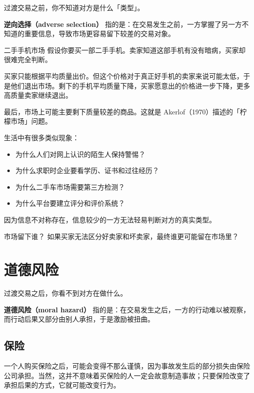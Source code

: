 \documentclass[10pt,a4paper]{ctexart}
\newcommand{\transitionnote}[1]{\begin{conceptbox}{过渡}#1\end{conceptbox}}
\begin{document}
\transitionnote{交易之前，你不知道对方是什么「类型」。}

\textbf{逆向选择（adverse selection）} 指的是：在交易发生之前，一方掌握了另一方不知道的重要信息，导致市场更容易留下较差的交易对象。

\begin{examplebox}{二手手机市场}
假设你要买一部二手手机。卖家知道这部手机有没有暗病，买家却很难完全判断。

买家只能根据平均质量出价。但这个价格对于真正好手机的卖家来说可能太低，于是他们退出市场。剩下的手机平均质量下降，买家愿意出的价格进一步下降，更多高质量卖家继续退出。

最后，市场上可能主要剩下质量较差的商品。这就是 Akerlof（1970）描述的「柠檬市场」问题。
\end{examplebox}

生活中有很多类似现象：
\begin{itemize}
  \item 为什么人们对网上认识的陌生人保持警惕？
  \item 为什么求职时企业要看学历、证书和过往经历？
  \item 为什么二手车市场需要第三方检测？
  \item 为什么平台要建立评分和评价系统？
\end{itemize}

因为信息不对称存在，信息较少的一方无法轻易判断对方的真实类型。

\begin{discussionbox}{市场留下谁？}
如果买家无法区分好卖家和坏卖家，最终谁更可能留在市场里？
\end{discussionbox}

\section{道德风险}

\transitionnote{交易之后，你看不到对方在做什么。}

\textbf{道德风险（moral hazard）} 指的是：在交易发生之后，一方的行动难以被观察，而行动后果又部分由别人承担，于是激励被扭曲。

\subsection{保险}

一个人购买保险之后，可能会变得不那么谨慎，因为事故发生后的部分损失由保险公司承担。当然，这并不意味着买保险的人一定会故意制造事故；只要保险改变了承担后果的方式，它就可能改变行为。
\end{document}
